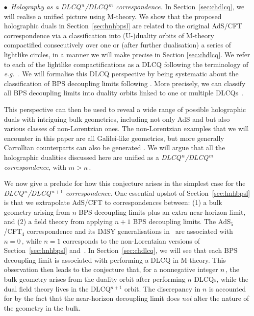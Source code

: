 \documentclass[11pt]{article}
\renewcommand{\emph}[1]{\textit{#1}}
\begin{document}
\vspace{3mm}

\noindent $\bullet$~\emph{Holography as a DLCQ${}^{\,n}$/DLCQ${}^{\,m}$ correspondence.}
In Section~\ref{sec:chdlcq}, we will realise a unified picture using M-theory. We show that the proposed holographic duals in Section~\ref{sec:hnhbpsl} are related to the original AdS/CFT correspondence via a classification into (U-)duality orbits of M-theory compactified consecutively over one or (after further dualisation) a series of lightlike circles, in a manner we will make precise in Section \ref{sec:chdlcq}. We refer to each of the lightlike compactifications as a DLCQ following the terminology of \emph{e.g.}~\cite{Susskind:1997cw}. 
We will formalise this DLCQ perspective by being systematic about the classification of BPS decoupling limits following \cite{Blair:2023noj, Gomis:2023eav}. More precisely, we can classify all BPS decoupling limits into duality orbits linked to one or multiple DLCQs~\cite{bpslimits}.

This perspective can then be used to reveal a wide range of possible holographic duals with intriguing bulk geometries, including not only AdS and but also various classes of non-Lorentzian ones. 
The non-Lorentzian examples that we will encounter in this paper are all Galilei-like geometries, but more generally Carrollian counterparts can also be generated \cite{Blair:2023noj, Gomis:2023eav}.
We will argue that all the holographic dualities discussed here are unified as a \emph{DLCQ${}^{\,n}$/DLCQ${}^{\,m}$ correspondence}, with $m > n$\,. 

We now give a prelude for how this conjecture arises in the simplest case for the \emph{DLCQ${}^{\,n}$/DLCQ${}^{\,n+1}$ correspondence}. 
One essential upshot of Section~\ref{sec:hnhbpsl} is that we extrapolate AdS/CFT to correspondences between: (1) a bulk geometry 
arising from $n$ BPS decoupling limits plus an extra near-horizon limit, and (2) a field theory from applying $n+1$ BPS decoupling limits. 
The AdS${}_5$/CFT${}_4$ correspondence and its IMSY generalisations in~\cite{Itzhaki:1998dd} are associated with $n=0$\,, while $n=1$ corresponds to the non-Lorentzian versions of Section~\ref{sec:hnhbpsl} and~\cite{Lambert:2024yjk, Lambert:2024uue, Fontanella:2024rvn, Fontanella:2024kyl}. In Section~\ref{sec:chdlcq}, we will see that each BPS decoupling limit is associated with performing a DLCQ in M-theory. This observation then leads to the conjecture that, for a nonnegative integer $n$\,, the bulk geometry arises from the duality orbit after performing $n$ DLCQs, while the dual field theory lives in the DLCQ${}^{n+1}$ orbit. 
The discrepancy in $n$ is accounted for by the fact that the near-horizon decoupling limit does \emph{not} alter the nature of the geometry in the bulk.
\end{document}
